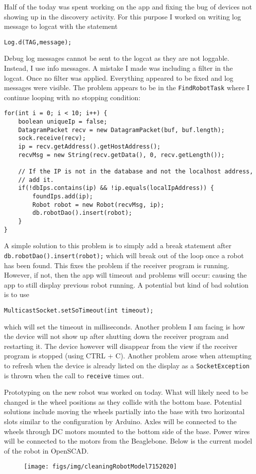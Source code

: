 \documentclass[fontsize=11pt, %
                             paper=a4, %
                             twoside, %
                             captions=tableheading,
                             index=totoc,
                             hyperref]{labbook}
\begin{document}
\begin{addmargin}[0cm]{0cm}
Half of the today was spent working on the app and fixing the bug of devices not showing up in the discovery activity. For this purpose I worked on writing log message to logcat with the statement
\begin{Verbatim}
Log.d(TAG,message);
\end{Verbatim}
Debug log messages cannot be sent to the logcat as they are not loggable. Instead, I use info messages. A mistake I made was including a filter in the logcat. Once no filter was applied. Everything appeared to be fixed and log messages were visible. The problem appears to be in the \texttt{FindRobotTask} where I continue looping with no stopping condition:
\begin{Verbatim}
for(int i = 0; i < 10; i++) {
	boolean uniqueIp = false;
	DatagramPacket recv = new DatagramPacket(buf, buf.length);
	sock.receive(recv);
	ip = recv.getAddress().getHostAddress();
	recvMsg = new String(recv.getData(), 0, recv.getLength());

	// If the IP is not in the database and not the localhost address, 
	// add it.
	if(!dbIps.contains(ip) && !ip.equals(localIpAddress)) {
		foundIps.add(ip);
		Robot robot = new Robot(recvMsg, ip);
		db.robotDao().insert(robot);
	}
}
\end{Verbatim}
A simple solution to this problem is to simply add a break statement after \texttt{db.robotDao().insert(robot);} which will break out of the loop once a robot has been found. This fixes the problem if the receiver program is running. However, if not, then the app will timeout and problems will occur: causing the app to still display previous robot running. A potential but kind of bad solution is to use
\begin{Verbatim}
MulticastSocket.setSoTimeout(int timeout);
\end{Verbatim}
which will set the timeout in milliseconds.
\medbreak\noindent
Another problem I am facing is how the device will not show up after shutting down the receiver program and restarting it. The device however will disappear from the view if the receiver program is stopped (using CTRL + C). Another problem arose when attempting to refresh when the device is already listed on the display as a \texttt{SocketException} is thrown 
when the call to \texttt{receive} times out.

Prototyping on the new robot was worked on today. What will likely need to be changed is the wheel positions as they collide with the bottom base. Potential solutions include moving the wheels partially into the base with two horizontal slots similar to the configuration by Arduino. Axles will be connected to the wheels through DC motors mounted to the bottom side of the base. Power wires will be connected to the motors from the Beaglebone. Below is the current model of the robot in OpenSCAD.
\begin{figure}[H]
\center
\texttt{[image: figs/img/cleaningRobotModel7152020]}
\end{figure}


\end{addmargin}
\end{document}
